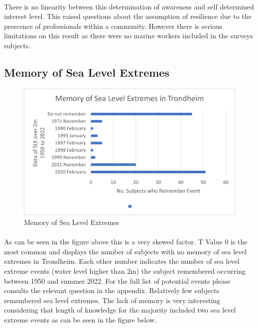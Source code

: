 \paragraph{}

There is no linearity between this determination of awareness and self determined interest level. This raised questions about the assumption of resilience due to the prescence of professionals within a community. However there is serious limitations on this result as there were no marine workers included in the surveys subjects.


\subsection{Memory of Sea Level Extremes}

\begin{figure}[h]
    \centering
    \includegraphics{fig_results/memory-sle.png}
    \caption{Memory of Sea Level Extremes}
    \label{fig:my_label}
\end{figure}
\paragraph{}


As can be seen in the figure above this is a very skewed factor. T Value 0 is the most common and displays the number of subjects with no memory of sea level extremes in Trondheim. Each other number indicates the number of sea level extreme events (water level higher than 2m) the subject remembered occurring between 1950 and summer 2022. For the full list of potential events please consults the relevant question in the appendix. Relatively few subjects remembered sea level extremes. The lack of memory is very interesting considering that length of knowledge for the majority included two sea level extreme events as can be seen in the figure below. 

